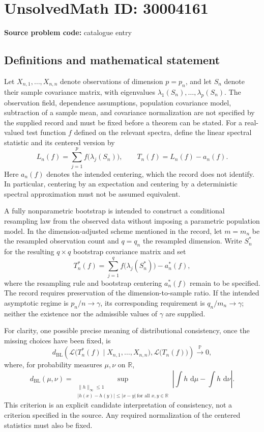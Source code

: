 \documentclass[11pt]{article}
\newcommand{\R}{\mathbb{R}}
\newcommand{\dd}{\,\mathrm{d}}
\begin{document}
\section*{UnsolvedMath ID: 30004161}
\textbf{Source problem code:} catalogue entry
\subsection{Definitions and mathematical statement}
Let \(X_{n,1},\ldots,X_{n,n}\) denote observations of dimension \(p=p_n\), and let \(S_n\) denote their sample covariance matrix, with eigenvalues \(\lambda_1(S_n),\ldots,\lambda_p(S_n)\). The observation field, dependence assumptions, population covariance model, subtraction of a sample mean, and covariance normalization are not specified by the supplied record and must be fixed before a theorem can be stated. For a real-valued test function \(f\) defined on the relevant spectra, define the linear spectral statistic and its centered version by
\[
L_n(f)=\sum_{j=1}^{p} f\bigl(\lambda_j(S_n)\bigr),
\qquad T_n(f)=L_n(f)-a_n(f).
\]
Here \(a_n(f)\) denotes the intended centering, which the record does not identify. In particular, centering by an expectation and centering by a deterministic spectral approximation must not be assumed equivalent.

A fully nonparametric bootstrap is intended to construct a conditional resampling law from the observed data without imposing a parametric population model. In the dimension-adjusted scheme mentioned in the record, let \(m=m_n\) be the resampled observation count and \(q=q_n\) the resampled dimension. Write \(S_n^*\) for the resulting \(q\times q\) bootstrap covariance matrix and set
\[
T_n^*(f)=\sum_{j=1}^{q} f\bigl(\lambda_j(S_n^*)\bigr)-a_n^*(f),
\]
where the resampling rule and bootstrap centering \(a_n^*(f)\) remain to be specified. The record requires preservation of the dimension-to-sample ratio. If the intended asymptotic regime is \(p_n/n\to\gamma\), its corresponding requirement is \(q_n/m_n\to\gamma\); neither the existence nor the admissible values of \(\gamma\) are supplied.

For clarity, one possible precise meaning of distributional consistency, once the missing choices have been fixed, is
\[
d_{\mathrm{BL}}\!\left(
\mathcal L\bigl(T_n^*(f)\mid X_{n,1},\ldots,X_{n,n}\bigr),
\mathcal L\bigl(T_n(f)\bigr)
\right)\xrightarrow{\mathbb P}0,
\]
where, for probability measures \(\mu,\nu\) on \(\R\),
\[
d_{\mathrm{BL}}(\mu,\nu)=
\sup_{\substack{\|h\|_\infty\leq 1\\ |h(x)-h(y)|\leq |x-y|\ \text{for all }x,y\in\R}}
\left|\int h\,\dd\mu-\int h\,\dd\nu\right|.
\]
This criterion is an explicit candidate interpretation of consistency, not a criterion specified in the source. Any required normalization of the centered statistics must also be fixed.
\end{document}
